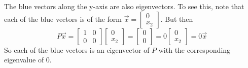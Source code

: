 \documentclass{ximera}
\begin{document}
\begin{example}
\begin{explanation}
\begin{center}
\end{center}
    
The blue vectors along the y-axis are also eigenvectors.  To see this, note that each of the blue vectors is of the form $\vec{x}=\begin{bmatrix}0\\x_2\end{bmatrix}$.  But then $$P\vec{x}=\begin{bmatrix}1&0\\0&0\end{bmatrix}\begin{bmatrix}0\\x_2\end{bmatrix}=\begin{bmatrix}0\\0\end{bmatrix}=0\begin{bmatrix}0\\x_2\end{bmatrix}=0\vec{x}$$
So each of the blue vectors is an eigenvector of $P$ with the corresponding eigenvalue of $0$.
\end{explanation}
\end{example}
    
\end{document}
